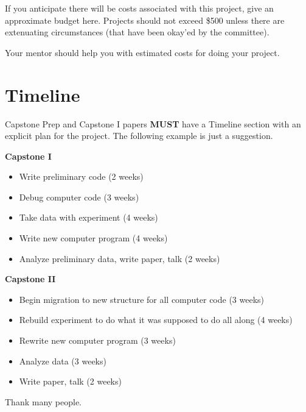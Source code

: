 \documentclass[aps,prb,twocolumn,groupedaddress,nofootinbib,floatfix]{revtex4}
\begin{document}
If you anticipate there will be costs associated with this project, give an approximate budget here.  Projects should not exceed \$500 unless there are extenuating circumstances (that have been okay'ed by the committee).

Your mentor should help you with estimated costs for doing your project.

\section*{Timeline}

Capstone Prep and Capstone I papers {\bf MUST} have a Timeline section with an explicit
plan for the project.  The following example is just a suggestion.

\vspace{0.2in}
{\bf Capstone I}
\begin{itemize}\itemsep1pt \parskip0pt 
\item Write preliminary code (2 weeks)
\item Debug computer code (3 weeks)
\item Take data with experiment (4 weeks)
\item Write new computer program (4 weeks)
\item Analyze preliminary data, write paper, talk (2 weeks)
\end{itemize}
{\bf Capstone II} 
\begin{itemize}\itemsep1pt \parskip0pt
\item Begin migration to new structure for all computer code (3 weeks)
\item Rebuild experiment to do what it was supposed to do all along (4 weeks)
\item Rewrite new computer program (3 weeks)
\item Analyze data (3 weeks)
\item Write paper, talk (2 weeks)
\end{itemize}

\begin{acknowledgments}
Thank many people.
\end{acknowledgments}
%
%



\end{document}
